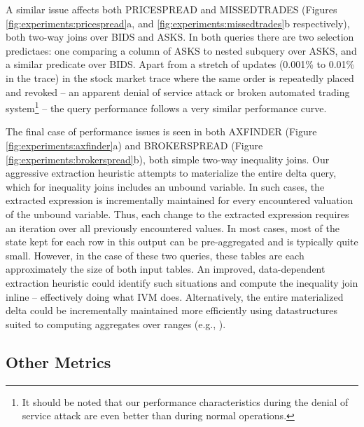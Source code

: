 A similar issue affects both PRICESPREAD and MISSEDTRADES (Figures \ref{fig:experiments:pricespread}a, and \ref{fig:experiments:missedtrades}b respectively), both two-way joins over BIDS and ASKS.  In both queries there are two selection predictaes: one comparing a column of ASKS to nested subquery over ASKS, and a similar predicate over BIDS.  Apart from a stretch of updates (0.001\% to 0.01\% in the trace) in the stock market trace where the same order is repeatedly placed and revoked -- an apparent denial of service attack or broken automated trading system\footnote{It should be noted that our performance characteristics during the denial of service attack are even better than during normal operations.} -- the query performance follows a very similar performance curve. 

The final case of performance issues is seen in both AXFINDER (Figure \ref{fig:experiments:axfinder}a) and BROKERSPREAD (Figure \ref{fig:experiments:brokerspread}b), both simple two-way inequality joins.  Our aggressive extraction heuristic attempts to materialize the entire delta query, which for inequality joins includes an unbound variable.  In such cases, the extracted expression is incrementally maintained for every encountered valuation of the unbound variable.  Thus, each change to the extracted expression requires an iteration over all previously encountered values.  In most cases, most of the state kept for each row in this output can be pre-aggregated and is typically quite small.  However, in the case of these two queries, these tables are each approximately the size of both input tables.  An improved, data-dependent extraction heuristic could identify such situations and compute the inequality join inline -- effectively doing what IVM does.  Alternatively, the entire materialized delta could be incrementally maintained more efficiently using datastructures suited to computing aggregates over ranges (e.g., \cite{range trees}).


\subsection{Other Metrics}
\label{sec:experiments:othermetrics}

